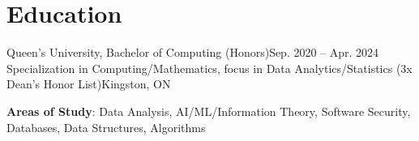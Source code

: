 \section{Education}
  \resumeSubHeadingListStart
    \resumeSubheading
      {Queen's University, Bachelor of Computing (Honors)}{Sep. 2020 -- Apr. 2024}
      {Specialization in Computing/Mathematics, focus in Data Analytics/Statistics (3x Dean's Honor List)}{Kingston, ON}
      \begin{itemize}[leftmargin=0.0in, label={}]
    \small{\item{
     \textbf{Areas of Study}{: Data Analysis, AI/ML/Information Theory, Software Security, Databases, Data Structures, Algorithms}
    }}
 \end{itemize}
  \resumeSubHeadingListEnd